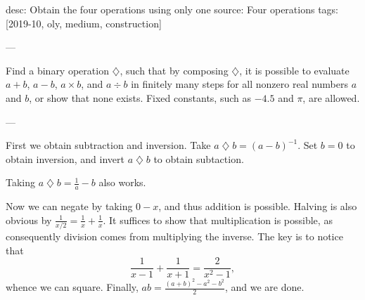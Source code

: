 desc: Obtain the four operations using only one
source: Four operations
tags: [2019-10, oly, medium, construction]

---

Find a binary operation $\mathbin\diamondsuit$, such that by composing $\mathbin\diamondsuit$, it is possible to evaluate $a+b$, $a-b$, $a\times b$, and $a\div b$ in finitely many steps for all nonzero real numbers $a$ and $b$, or show that none exists. Fixed constants, such as $-4.5$ and $\pi$, are allowed.

---

First we obtain subtraction and inversion. Take $a\mathbin\diamondsuit b=(a-b)^{-1}$. Set $b=0$ to obtain inversion, and invert $a\mathbin\diamondsuit b$ to obtain subtaction.
\begin{boxremark}
    Taking $a\mathbin\diamondsuit b=\frac1a-b$ also works.
\end{boxremark}
Now we can negate by taking $0-x$, and thus addition is possible. Halving is also obvious by $\frac1{x/2}=\frac1x+\frac1x$. It suffices to show that multiplication is possible, as consequently division comes from multiplying the inverse. The key is to notice that\[\frac1{x-1}+\frac1{x+1}=\frac2{x^2-1},\]
whence we can square. Finally, $ab=\frac{(a+b)^2-a^2-b^2}2$, and we are done.

